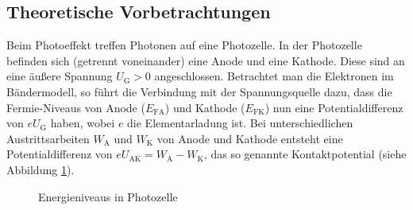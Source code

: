 \subsection{Theoretische Vorbetrachtungen}
Beim Photoeffekt treffen Photonen auf eine Photozelle. In der Photozelle befinden sich (getrennt voneinander) eine Anode und eine Kathode. Diese sind an eine äußere Spannung $U_\mathrm{G}>0$ angeschlossen. Betrachtet man die Elektronen im Bändermodell, so führt die Verbindung mit der Spannungsquelle dazu, dass die Fermie-Niveaus von Anode ($E_\mathrm{FA}$) und Kathode ($E_\mathrm{FK}$) nun eine Potentialdifferenz von $e U_\mathrm{G}$ haben, wobei $e$ die Elementarladung ist. Bei unterschiedlichen Austrittsarbeiten $W_\mathrm{A}$ und $W_\mathrm{K}$ von Anode und Kathode entsteht eine Potentialdifferenz von $eU_\mathrm{AK}=W_\mathrm{A}-W_\mathrm{K}$, das so genannte Kontaktpotential (siehe Abbildung \ref{Photozelle}). 

\begin{figure}[h]
  \centering
  \caption{Energieniveaus in Photozelle}
  \label{Photozelle}
\end{figure}

